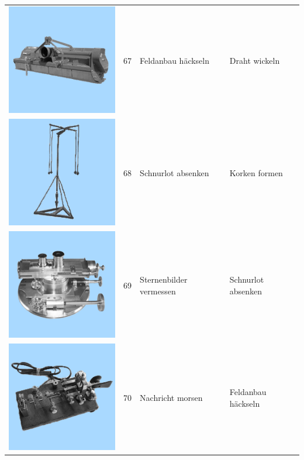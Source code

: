 \documentclass[
  english,
  man,floatsintext]{apa7}
\begin{document}
\begin{center}
\begin{ThreePartTable}
\begin{longtable}{llll}
\includegraphics[valign=c, scale=0.19]{../materials/unfamiliar/67.png} & 67 & Feldanbau häckseln & Draht wickeln\\
\includegraphics[valign=c, scale=0.19]{../materials/unfamiliar/68.png} & 68 & Schnurlot absenken & Korken formen\\
\includegraphics[valign=c, scale=0.19]{../materials/unfamiliar/69.png} & 69 & Sternenbilder vermessen & Schnurlot absenken\\
\includegraphics[valign=c, scale=0.19]{../materials/unfamiliar/70.png} & 70 & Nachricht morsen & Feldanbau häckseln\\

\end{longtable}
\end{ThreePartTable}
\end{center}
\end{document}
